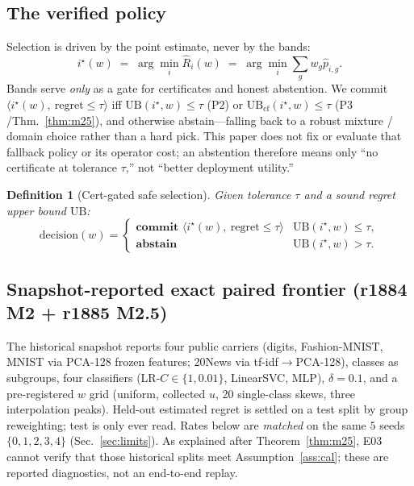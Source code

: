 \documentclass{article}
\newtheorem{definition}{Definition}
\begin{document}
\subsection{The verified policy}
Selection is driven by the point estimate, never by the bands:
\[
  i^\star(w)\;=\;\arg\min_i \hat R_i(w)\;=\;\arg\min_i \textstyle\sum_g w_g \hat p_{i,g}.
\]
Bands serve \emph{only} as a gate for certificates and honest abstention. We commit
$\langle i^\star(w),\ \mathrm{regret}\le\tau\rangle$ iff $\mathrm{UB}(i^\star,w)\le\tau$
($\mathrm{P2}$) or $\mathrm{UB}_{\mathrm{cf}}(i^\star,w)\le\tau$ ($\mathrm{P3}$/Thm.~\ref{thm:m25}),
and otherwise abstain---falling back to a robust mixture / domain choice rather than a hard
pick. This paper does not fix or evaluate that fallback policy or its operator cost; an
abstention therefore means only ``no certificate at tolerance $\tau$,'' not ``better
deployment utility.''

\begin{definition}[Cert-gated safe selection]
\label{def:gated}
Given tolerance $\tau$ and a sound regret upper bound $\mathrm{UB}$:
\[
  \mathrm{decision}(w)=\begin{cases}
    \textbf{commit }\langle i^\star(w),\ \mathrm{regret}\le\tau\rangle &
      \mathrm{UB}(i^\star,w)\le\tau,\\
    \textbf{abstain} & \mathrm{UB}(i^\star,w)>\tau.
  \end{cases}
\]
\end{definition}

\subsection{Snapshot-reported exact paired frontier (r1884 M2 + r1885 M2.5)}
The historical snapshot reports four public carriers (digits, Fashion-MNIST, MNIST via PCA-128 frozen features;
20News via tf-idf$\to$PCA-128), classes as subgroups, four classifiers (LR-$C{\in}\{1,0.01\}$,
LinearSVC, MLP), $\delta{=}0.1$, and a pre-registered $w$ grid (uniform, collected $u$, 20
single-class skews, three interpolation peaks). Held-out estimated regret is settled on a test
split by group reweighting; test is only ever read. Rates below are \emph{matched} on the
same $5$ seeds $\{0,1,2,3,4\}$ (Sec.~\ref{sec:limits}). As explained after
Theorem~\ref{thm:m25}, E03 cannot verify that those historical splits meet
Assumption~\ref{ass:cal}; these are reported diagnostics, not an end-to-end replay.
\end{document}

